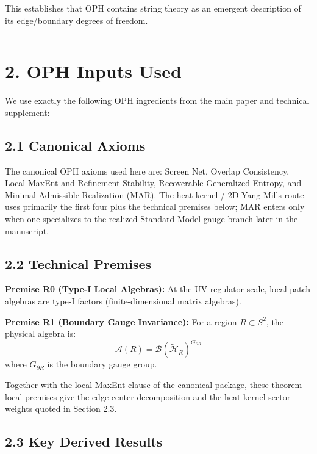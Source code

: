 This establishes that OPH contains string theory as an emergent description of its edge/boundary degrees of freedom.

\begin{center}\rule{0.5\linewidth}{0.5pt}\end{center}

\section{2. OPH Inputs Used}\label{2-oph-inputs-used}

We use exactly the following OPH ingredients from the main paper and technical supplement:

\subsection{2.1 Canonical Axioms}\label{21-core-axioms}

The canonical OPH axioms used here are: Screen Net, Overlap Consistency, Local MaxEnt and Refinement Stability, Recoverable Generalized Entropy, and Minimal Admissible Realization (MAR). The heat-kernel / 2D Yang-Mills route uses primarily the first four plus the technical premises below; MAR enters only when one specializes to the realized Standard Model gauge branch later in the manuscript.

\subsection{2.2 Technical Premises}\label{22-regulator-premises}

\textbf{Premise R0 (Type-I Local Algebras):} At the UV regulator scale, local patch algebras are type-I factors (finite-dimensional matrix algebras).

\textbf{Premise R1 (Boundary Gauge Invariance):} For a region \(R \subset S^2\), the physical algebra is: \[\mathcal{A}(R) = \mathcal{B}(\tilde{\mathcal{H}}_R)^{G_{\partial R}}\] where \(G_{\partial R}\) is the boundary gauge group.

Together with the local MaxEnt clause of the canonical package, these theorem-local premises give the edge-center decomposition and the heat-kernel sector weights quoted in Section 2.3.

\subsection{2.3 Key Derived Results}\label{23-key-derived-results}

